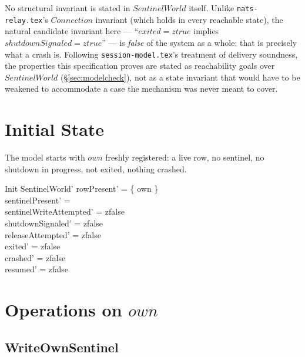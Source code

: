 \documentclass[a4paper,10pt,fleqn]{article}
\begin{document}
No structural invariant is stated in $SentinelWorld$ itself.  Unlike
\texttt{nats-relay.tex}'s $Connection$ invariant (which holds in every
reachable state), the natural candidate invariant here ---
``$exited = ztrue$ implies $shutdownSignaled = ztrue$'' --- is
\emph{false} of the system as a whole: that is precisely what a crash
is.  Following \texttt{session-model.tex}'s treatment of delivery
soundness, the properties this specification proves are stated as
reachability goals over $SentinelWorld$ (\S\ref{sec:modelcheck}), not as
a state invariant that would have to be weakened to accommodate a case
the mechanism was never meant to cover.

\section{Initial State}

The model starts with $own$ freshly registered: a live row, no
sentinel, no shutdown in progress, not exited, nothing crashed.

\begin{schema}{Init}
  SentinelWorld'
  \where
  rowPresent' = \{ own \} \\
  sentinelPresent' = \emptyset \\
  sentinelWriteAttempted' = zfalse \\
  shutdownSignaled' = zfalse \\
  releaseAttempted' = zfalse \\
  exited' = zfalse \\
  crashed' = zfalse \\
  resumed' = zfalse
\end{schema}

\section{Operations on $own$}

\subsection{WriteOwnSentinel}
\end{document}
